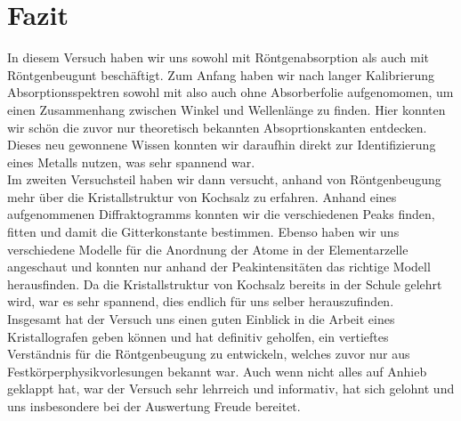 \section{\label{sec:fazit}Fazit}
In diesem Versuch haben wir uns sowohl mit Röntgenabsorption als auch mit Röntgenbeugunt beschäftigt. Zum Anfang haben wir nach langer Kalibrierung Absorptionsspektren sowohl mit also auch ohne Absorberfolie aufgenomomen, um einen Zusammenhang zwischen Winkel und Wellenlänge zu finden. Hier konnten wir schön die zuvor nur theoretisch bekannten Absoprtionskanten entdecken. Dieses neu gewonnene Wissen konnten wir daraufhin direkt zur Identifizierung eines Metalls nutzen, was sehr spannend war.\\
Im zweiten Versuchsteil haben wir dann versucht, anhand von Röntgenbeugung mehr über die Kristallstruktur von Kochsalz zu erfahren. Anhand eines aufgenommenen Diffraktogramms konnten wir die verschiedenen Peaks finden, fitten und damit die Gitterkonstante bestimmen. Ebenso haben wir uns verschiedene Modelle für die Anordnung der Atome in der Elementarzelle angeschaut und konnten nur anhand der Peakintensitäten das richtige Modell herausfinden. Da die Kristallstruktur von Kochsalz bereits in der Schule gelehrt wird, war es sehr spannend, dies endlich für uns selber herauszufinden. \\
Insgesamt hat der Versuch uns einen guten Einblick in die Arbeit eines Kristallografen geben können und hat definitiv geholfen, ein vertieftes Verständnis für die Röntgenbeugung zu entwickeln, welches zuvor nur aus Festkörperphysikvorlesungen bekannt war. Auch wenn nicht alles auf Anhieb geklappt hat, war der Versuch sehr lehrreich und informativ, hat sich gelohnt und uns insbesondere bei der Auswertung Freude bereitet.  